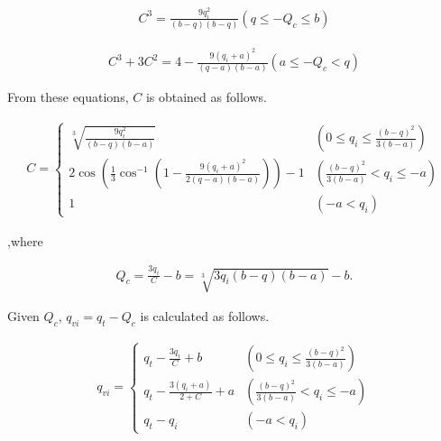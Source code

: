 \begin{eqnarray}
C^{3}=\frac{9 q_{i}^{2}}{(b-q)(b-q)} \left(q \leq-Q_{c} \leq b\right)
\end{eqnarray}

\begin{eqnarray}
C^{3}+3 C^{2}=4-\frac{9\left(q_{i}+a\right)^{2}}{(q-a)(b-a)} \left(a \leq-Q_{c}<q\right)
\end{eqnarray}

From these equations, \(C\) is obtained as follows.

\begin{eqnarray}
C=\left\{\begin{array}{ll}
\sqrt[3]{\frac{9 q_{i}^{2}}{(b-q)(b-a)}} & \left(0 \leq q_{i} \leq \frac{(b-q)^{2}}{3(b-a)}\right) \\
2 \cos \left(\frac{1}{3} \cos ^{-1}\left(1-\frac{9\left(q_{i}+a\right)^{2}}{2(q-a)(b-a)}\right)\right)-1 & \left(\frac{(b-q)^{2}}{3(b-a)}<q_{i} \leq-a\right)\\
1 & \left(-a<q_{i}\right)
\end{array}\right.
\end{eqnarray}

,where

\begin{eqnarray}
Q_{c}=\frac{3 q_{i}}{C}-b=\sqrt[3]{3 q_{i}(b-q)(b-a)}-b.
\end{eqnarray}

Given \(Q_{c}\), \(q_{v i}=q_{t}-Q_{c}\) is calculated as follows.

\begin{eqnarray}
q_{v i}=\left\{\begin{array}{ll}
q_{t}-\frac{3 q_{i}}{C}+b & \left(0 \leq q_{i} \leq \frac{(b-q)^{2}}{3(b-a)}\right) \\
q_{t}-\frac{3\left(q_{i}+a\right)}{2+C}+a & \left(\frac{(b-q)^{2}}{3(b-a)}<q_{i} \leq-a\right) \\
q_{t}-q_{i} & \left(-a<q_{i}\right)
\end{array}\right.
\end{eqnarray}
